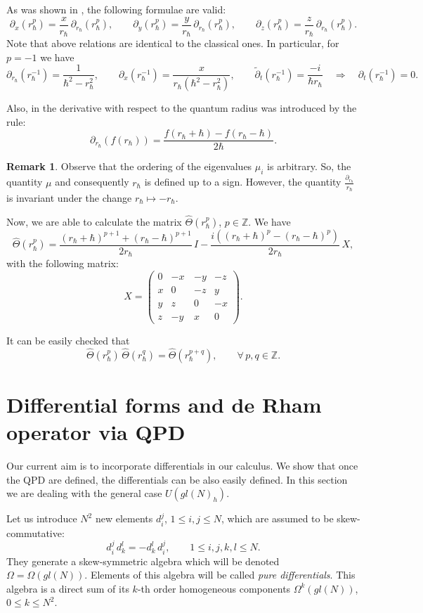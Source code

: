 \documentclass[11pt]{article}
\newcommand{\pa}{\partial}
\newcommand{\tpa}{\widetilde{\pa}}
\newcommand{\hh}{\hbar}
\newcommand{\hatt}{\widehat{\Theta}}
\newcommand{\rh}{r_{\hbar}}
\newcommand{\parh}{\pa_{\rh}}
\newcommand{\Om}{\Omega}
\numberwithin{equation}{section}
\theoremstyle{plain}
\theoremstyle{definition}
\newtheorem{remark}[theorem]{Remark}
\begin{document}
As was shown in \cite{GS2}, the following formulae are valid:
\begin{equation}
\pa_x(\rh^p)=\frac{x}{\rh}\,\parh(\rh^p), \qquad \pa_y(\rh^p)=\frac{y}{\rh}\,\parh(\rh^p),\qquad  \pa_z(\rh^p)=\frac{z}{\rh}\,\parh(\rh^p).
\label{ppp}
\end{equation}
Note that above relations are identical to the classical ones. In particular, for $p=-1$ we have
\[
\parh(\rh^{-1})=\frac{1}{\hh^2-\rh^2},\qquad \pa_x(\rh^{-1})=\frac{x}{\rh(\hh^2-\rh^2)},\qquad
\tpa_t(\rh^{-1})=\frac{-i}{\hh \rh}\quad\Rightarrow\quad \partial_t(\rh^{-1}) = 0.
\]

Also, in \cite{GS2} the derivative with respect to the quantum radius was introduced by the rule:
\[
\parh(f(\rh))=\frac{f(\rh+\hh)-f(\rh-\hh)}{2\hh}.
\]
\begin{remark}
Observe that the ordering of the eigenvalues $\mu_i$ is arbitrary. So, the quantity $\mu$ and consequently $\rh$ is defined up
to a sign. However, the	quantity $\frac{\pa_{\rh}}{\rh}$ is invariant under the change $\rh\mapsto -\rh$.
\end{remark}

Now, we are able to calculate the matrix $\hatt(\rh^p)$, $p \in \mathbb{Z}$. We have
\begin{equation}
\hatt(\rh^p)=\frac{(\rh+\hh)^{p+1}+(\rh-\hh)^{p+1}}{2\rh}\, I-\frac{i((\rh+\hh)^{p}-(\rh-\hh)^{p})}{2\rh}\, X,
\label{ten}
\end{equation}
with the following matrix:
\[
X=
\left(\!\!
\begin{array}{cccc}
	0 & -x\,&-y&-z\\
	x& 0 &-z&y\\
	y& z & 0 & -x\\
	z&-y&  x& 0
\end{array}
\!\!\right).
\]

It can be easily checked that
\[
\hatt(\rh^p)\,\hatt(\rh^q)=\hatt(\rh^{p+q}),\qquad \forall\, p,q \in \mathbb{Z}.
\]

\section{Differential forms and de Rham operator via QPD}\label{sec:differential}

Our current aim is to incorporate  differentials in our calculus. We show that once the QPD are defined, the differentials can be also
easily defined. In this section we are dealing with the general case $U(gl(N)_h)$.

Let us introduce $N^2$ new elements $d_i^j$, $1\le i,j\le N$, which are assumed to be skew-com\-mu\-ta\-tive:
\[
d_i^j\, d_k^l=-d_k^l\, d_i^j,\qquad 1\leq i,j,k,l \leq N.
\]
They generate a skew-symmetric algebra which will be denoted $\Om=\Om(gl(N))$. Elements of this algebra will be called
{\em pure differentials}. This algebra is a direct sum of its $k$-th order homogeneous components $\Om^k(gl(N))$, $0\le k\le N^2$.
\end{document}

